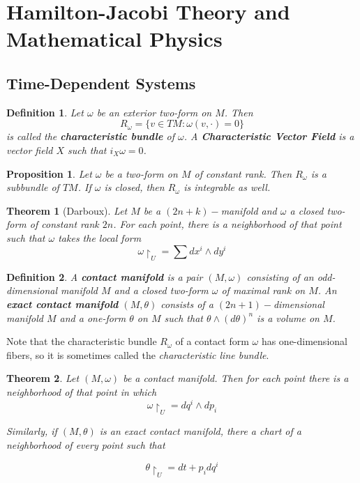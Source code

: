 \documentclass{article}
\newtheorem{thm}{Theorem}
\newtheorem{defn}{Definition}
\newtheorem{prop}{Proposition}
\begin{document}
\section{Hamilton-Jacobi Theory and Mathematical Physics}
\subsection{Time-Dependent Systems}

\begin{defn}

Let $\omega$ be an exterior two-form on $M$. Then
\[R_{\omega}=\{v \in TM: \omega(v, \cdot) = 0 \}\]
is called the \textbf{characteristic bundle} of $\omega$. A \textbf{Characteristic Vector Field} is a vector field $X$ such that $i_X \omega=0$.

\end{defn}

\begin{prop}

Let $\omega$ be a two-form on $M$ of constant rank. Then $R_{\omega}$ is a subbundle of $TM$. If $\omega$ is closed, then $R_{\omega}$ is integrable as well.

\end{prop}

\begin{thm}[Darboux]

Let $M$ be a $(2n+k)-$manifold and $\omega$ a closed two-form of constant rank $2n$. For each point, there is a neighborhood of that point such that $\omega$ takes the local form
\[\omega \restriction_{U}= \sum dx^i \wedge dy^i\]

\end{thm}

\begin{defn}

A \textbf{contact manifold} is a pair $(M, \omega)$ consisting of an odd-dimensional manifold $M$ and a closed two-form $\omega$ of maximal rank on $M$. An \textbf{exact contact manifold} $(M,\theta)$ consists of a $(2n+1)-$dimensional manifold $M$ and a one-form $\theta$ on $M$ such that $\theta \wedge (d\theta)^n$ is a volume on $M$.

\end{defn}

Note that the characteristic bundle $R_{\omega}$ of a contact form $\omega$ has one-dimensional fibers, so it is sometimes called the \textit{characteristic line bundle}.

\begin{thm}

Let $(M,\omega)$ be a contact manifold. Then for each point there is a neighborhood of that point in which
\[
\omega \restriction_U = dq^i \wedge dp_i
\]

Similarly, if $(M,\theta)$ is an exact contact manifold, there a chart of a neighborhood of every point such that 

\[
\theta \restriction_U = dt + p_i dq^i
\]

\end{thm}
\end{document}
